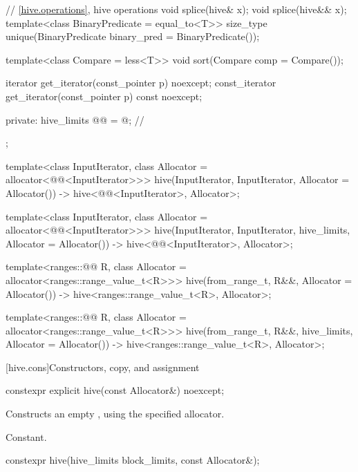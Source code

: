 \begin{codeblock}
{{    // \ref{hive.operations}, hive operations
    void splice(hive& x);
    void splice(hive&& x);
    template<class BinaryPredicate = equal_to<T>>
      size_type unique(BinaryPredicate binary_pred = BinaryPredicate());

    template<class Compare = less<T>>
      void sort(Compare comp = Compare());

    iterator get_iterator(const_pointer p) noexcept;
    const_iterator get_iterator(const_pointer p) const noexcept;

  private:
    hive_limits @@ = @\impdef@;     // \expos
  };

  template<class InputIterator, class Allocator = allocator<@@<InputIterator>>>
    hive(InputIterator, InputIterator, Allocator = Allocator())
      -> hive<@@<InputIterator>, Allocator>;

  template<class InputIterator, class Allocator = allocator<@@<InputIterator>>>
    hive(InputIterator, InputIterator, hive_limits, Allocator = Allocator())
      -> hive<@@<InputIterator>, Allocator>;

  template<ranges::@@ R, class Allocator = allocator<ranges::range_value_t<R>>>
    hive(from_range_t, R&&, Allocator = Allocator())
      -> hive<ranges::range_value_t<R>, Allocator>;

  template<ranges::@@ R, class Allocator = allocator<ranges::range_value_t<R>>>
    hive(from_range_t, R&&, hive_limits, Allocator = Allocator())
      -> hive<ranges::range_value_t<R>, Allocator>;
}
\end{codeblock}

[hive.cons]{Constructors, copy, and assignment}

%
\begin{itemdecl}
constexpr explicit hive(const Allocator&) noexcept;
\end{itemdecl}

\begin{itemdescr}
\pnum
\effects
Constructs an empty , using the specified allocator.

\pnum
\complexity
Constant.
\end{itemdescr}

%
\begin{itemdecl}
constexpr hive(hive_limits block_limits, const Allocator&);
\end{itemdecl}

